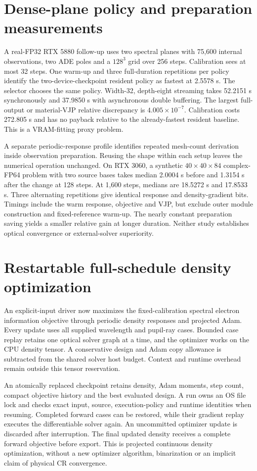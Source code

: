 \documentclass[11pt,a4paper]{article}
\begin{document}
\section{Dense-plane policy and preparation measurements}
A real-FP32 RTX 5880 follow-up uses two spectral planes with 75,600 internal
observations, two ADE poles and a $128^3$ grid over 256 steps. Calibration sees
at most 32 steps. One warm-up and three full-duration repetitions per policy
identify the two-device-checkpoint resident policy as fastest at 2.5578 s.
The selector chooses the same policy. Width-32, depth-eight streaming takes
52.2151 s synchronously and 37.9850 s with asynchronous double buffering.
The largest full-output or material-VJP relative discrepancy is
$4.005\times10^{-7}$. Calibration costs 272.805 s and has no payback relative
to the already-fastest resident baseline. This is a VRAM-fitting proxy problem.

A separate periodic-response profile identifies repeated mesh-count derivation
inside observation preparation. Reusing the shape within each setup leaves
the numerical operation unchanged. On RTX 3060, a synthetic $40\times40\times84$
complex-FP64 problem with two source bases takes median 2.0004 s before and
1.3154 s after the change at 128 steps. At 1,600 steps, medians are 18.5272 s
and 17.8533 s. Three alternating repetitions give identical response and
density-gradient bits. Timings include the warm response, objective and VJP,
but exclude outer module construction and fixed-reference warm-up. The nearly
constant preparation saving yields a smaller relative gain at longer duration.
Neither study establishes optical convergence or external-solver superiority.

\section{Restartable full-schedule density optimization}
An explicit-input driver now maximizes the fixed-calibration spectral electron
information objective through periodic density responses and projected Adam.
Every update uses all supplied wavelength and pupil-ray cases. Bounded case
replay retains one optical solver graph at a time, and the optimizer works on
the CPU density tensor. A conservative design and Adam copy allowance is
subtracted from the shared solver host budget. Context and runtime overhead
remain outside this tensor reservation.

An atomically replaced checkpoint retains density, Adam moments, step count,
compact objective history and the best evaluated design. A run owns an OS file
lock and checks exact input, source, execution-policy and runtime identities
when resuming. Completed forward cases can be restored, while their gradient
replay executes the differentiable solver again. An uncommitted optimizer
update is discarded after interruption. The final updated density receives
a complete forward objective before export. This is projected continuous
density optimization, without a new optimizer algorithm, binarization or
an implicit claim of physical CR convergence.
\end{document}
